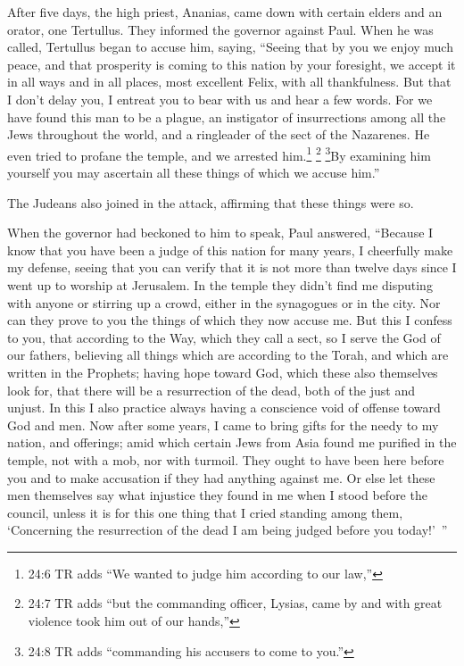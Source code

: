 \mychapter{} \myverse*{}After five days, the high priest, Ananias, came down with certain
elders and an orator, one Tertullus. They informed the governor against Paul.
\myverse{}When he was called, Tertullus began to accuse him, saying, “Seeing that by
you we enjoy much peace, and that prosperity is coming to this nation by your foresight,
\myverse{}we accept it in all ways and in all places, most excellent Felix, with all
thankfulness.
\myverse{}But that I don’t delay you, I entreat you to bear with us and hear a few words.
\myverse{}For we have found this man to be a plague, an instigator of insurrections among
all the Jews throughout the world, and a ringleader of the sect of the Nazarenes.
\myverse{}He even tried to profane the temple, and we arrested him.\footnote{24:6 TR adds “We wanted to judge him according to our law,”}
\myverse{}\footnote{24:7 TR adds “but the commanding officer, Lysias, came by and with great violence took him out of
	our hands,”}
\myverse{}\footnote{24:8 TR adds “commanding his accusers to come to you.”}By examining him yourself you may ascertain
all these things of which we accuse him.”

\myverse{}The Judeans also joined in the attack, affirming that these things
were so.

\myverse{}When the governor had beckoned to him to speak, Paul answered,
“Because I know that you have been a judge of this nation for many years, I cheerfully make my defense,
\myverse{}seeing that you can verify that it is not more than twelve days since I went
up to worship at Jerusalem.
\myverse{}In the temple they didn’t find me disputing with anyone or stirring up a
crowd, either in the synagogues or in the city.
\myverse{}Nor can they prove to you the things of which they now accuse me.
\myverse{}But this I confess to you, that according to the Way, which they call a sect,
so I serve the God of our fathers, believing all things which are according to the Torah, and which are
written in the Prophets;
\myverse{}having hope toward God, which these also themselves look for, that there
will be a resurrection of the dead, both of the just and unjust.
\myverse{}In this I also practice always having a conscience void of offense toward
God and men.
\myverse{}Now after some years, I came to bring gifts for the needy to my nation, and
offerings;
\myverse{}amid which certain Jews from Asia found me purified in the temple, not with
a mob, nor with turmoil.
\myverse{}They ought to have been here before you and to make accusation if they had
anything against me.
\myverse{}Or else let these men themselves say what injustice they found in me when
I stood before the council,
\myverse{}unless it is for this one thing that I cried standing among them, ‘Concerning
the resurrection of the dead I am being judged before you today!’ ”

